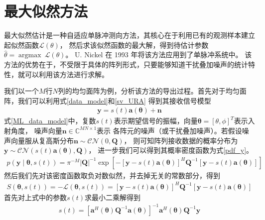 \documentclass[master]{thesis-uestc}
\begin{document}
\section{最大似然方法}
最大似然估计是一种自适应单脉冲测向方法，其核心在于利用已有的观测样本建立起似然函数$\mathcal{L}(\theta)$，
然后求该似然函数的最大解，得到待估计参数$\hat{\theta}=\operatorname{argmax}~\mathcal{L}(\theta)$。
U. Nickel 在 1993 年将该方法应用到了单脉冲系统中\cite{Nickel_93}。
该方法的优势在于，不受限于具体的阵列形式，只要能够知道干扰叠加噪声的统计特性，就可以利用该方法进行求解。

我们以一个$M$行$N$列的均匀面阵为例，分析该方法的导出过程。首先对于均匀面阵，我们可以利用式\eqref{data_model}和\eqref{sv_URA}
得到其接收信号模型
\begin{equation}\label{ML_data_model}
    \begin{aligned}
        \bm{y} = s(t)\bm{a}(\bm{\theta}) + \bm{n}
    \end{aligned}
\end{equation}
式\eqref{ML_data_model}中，复数$s(t)$表示期望信号的振幅，向量$\bm{\theta}=\left[\theta,\phi\right]^T$表示入射角度，
噪声向量$\bm{n}\in\mathbb{C}^{MN\times1}$表示
各阵元的噪声（或干扰叠加噪声）。若假设噪声向量服从复高斯分布$\bm{n}\sim\mathcal{CN}\left(0,\bm{Q}\right)$， 
则可知阵列接收数据的概率分布为$\bm{y}\sim\mathcal{CN}\left(s(t)\bm{a}(\bm{\theta}),\bm{Q}\right)$，
进一步我们可以得到其概率密度函数为式\eqref{pdf_y}。
\begin{equation}\label{pdf_y}
    \begin{aligned}
        p(\bm{y} \mid \bm{\theta}, s(t))=\pi^{-M}|\bm{Q}|^{-1} 
        \exp \left[-[\bm{y}-s(t) \bm{a}(\bm{\theta})]^{H} \bm{Q}^{-1}[\bm{y}-s(t) \bm{a}(\bm{\theta})]\right]
    \end{aligned}
\end{equation}
然后我们先对该密度函数取负对数似然，并去掉无关的常数部分，得到
\begin{equation}\label{lf_trans}
    \begin{aligned}
        S(\bm{\theta}, s(t))=-\mathcal{L}(\bm{\theta}, s(t))
        =[\bm{y}-s(t) \bm{a}(\bm{\theta})]^{H} \bm{Q}^{-1}[\bm{y}-s(t) \bm{a}(\bm{\theta})]
    \end{aligned}
\end{equation}
首先对上式中的参数$s(t)$求最小二乘解得到
\begin{equation}\label{least_square_s}
    \begin{aligned}
        s(t)=\left[\bm{a}^{H}(\bm{\theta}) \bm{Q}^{-1} \bm{a}(\bm{\theta})\right]^{-1} 
        \bm{a}^{H}(\bm{\theta}) \bm{Q}^{-1} \bm{y}
    \end{aligned}
\end{equation}
\end{document}
